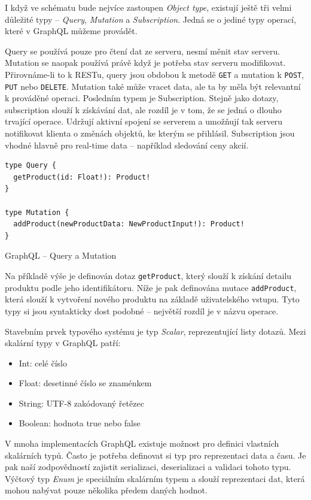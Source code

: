 \documentclass[thesis=M,czech]{FITthesis}[2019/12/23]
\begin{document}
I když ve schématu bude nejvíce zastoupen \textit{Object type}, existují ještě tři velmi důležité typy -- \textit{Query}, \textit{Mutation} a \textit{Subscription}. Jedná se o jediné typy operací, které v GraphQL můžeme provádět.

Query se používá pouze pro čtení dat ze serveru, nesmí měnit stav serveru. Mutation se naopak používá právě když je potřeba stav serveru modifikovat. Přirovnáme-li to k RESTu, query jsou obdobou k metodě \texttt{GET} a mutation k \texttt{POST}, \texttt{PUT} nebo \texttt{DELETE}. Mutation také může vracet data, ale ta by měla být relevantní k prováděné operaci.
Posledním typem je Subscription. Stejně jako dotazy, subscription slouží k získávání dat, ale rozdíl je v tom, že se jedná o dlouho trvající operace. Udržují aktivní spojení se serverem a umožňují tak serveru notifikovat klienta o změnách objektů, ke kterým se přihlásil. Subscription jsou vhodné hlavně pro real-time data -- například sledování ceny akcií.

\begin{listing}[H]
\begin{verbatim}
type Query {    
  getProduct(id: Float!): Product!
}

type Mutation {
  addProduct(newProductData: NewProductInput!): Product!
}
\end{verbatim}
\caption{GraphQL -- Query a Mutation}
\label{lst:graphql_query_mutation}
\end{listing}

Na příkladě výše je definován dotaz \texttt{getProduct}, který slouží k získání detailu produktu podle jeho identifikátoru. Níže je pak definována mutace \texttt{addProduct}, která slouží k vytvoření nového produktu na základě uživatelského vstupu. Tyto typy si jsou syntakticky dost podobné -- největší rozdíl je v názvu operace.

Stavebním prvek typového systému je typ \textit{Scalar}, reprezentující listy dotazů. Mezi skalární typy v GraphQL patří:
\begin{itemize}
    \item Int: celé číslo
    \item Float: desetinné číslo se znaménkem
    \item String: UTF-8 zakódovaný řetězec
    \item Boolean: hodnota true nebo false
\end{itemize}
V mnoha implementacích GraphQL existuje možnost pro definici vlastních skalárních typů. Často je potřeba definovat si typ pro reprezentaci data a času. Je pak naší zodpovědností zajistit serializaci, deserializaci a validaci tohoto typu. Výčtový typ \textit{Enum} je speciálním skalárním typem a slouží reprezentaci dat, která mohou nabývat pouze několika předem daných hodnot. 
\end{document}
